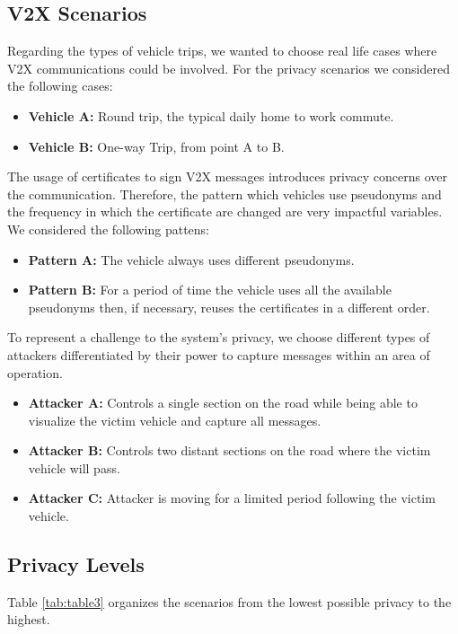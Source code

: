 		\subsection{V2X Scenarios}		
		Regarding the types of vehicle trips, we wanted to choose real life cases where V2X communications could be involved. For the privacy scenarios we considered the following cases:
		\begin{itemize}
			\item \textbf{Vehicle A:} Round trip, the typical daily home to work commute.
			\item \textbf{Vehicle B:} One-way Trip, from point A to B.
		\end{itemize}
		
		
		The usage of certificates to sign V2X messages introduces privacy concerns over the communication. Therefore, the pattern which vehicles use pseudonyms and the frequency in which the certificate are changed are very impactful variables. We considered the following pattens:
		\begin{itemize}
			\item \textbf{Pattern A:} The vehicle always uses different pseudonyms.
			\item \textbf{Pattern B:} For a period of time the vehicle uses all the available pseudonyms then, if necessary, reuses the certificates in a different order.
		\end{itemize}
		
		To represent a challenge to the system's privacy, we choose different types of attackers differentiated by their power to capture messages within an area of operation.
		\begin{itemize}
			\item \textbf{Attacker A:} Controls a single section on the road while being able to visualize the victim vehicle and capture all messages.
			\item \textbf{Attacker B:} Controls two distant sections on the road where the victim vehicle will pass.
			\item \textbf{Attacker C:} Attacker is moving for a limited period following the victim vehicle. 
		\end{itemize}
		
		
		
		\subsection{Privacy Levels}
		
		Table \ref{tab:table3} organizes the scenarios from the lowest possible privacy to the highest.
		
